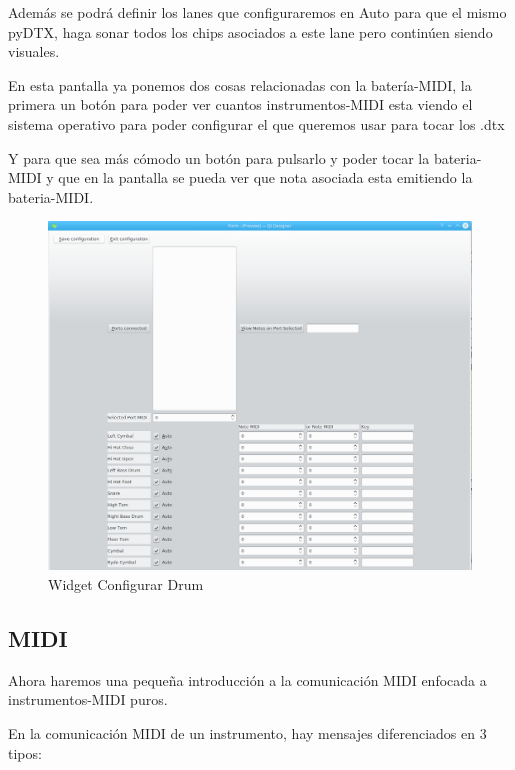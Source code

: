 \documentclass[a4paper,11pt,oneside]{book}
\begin{document}
Además se podrá definir los lanes que configuraremos en Auto para que el mismo pyDTX, haga sonar todos los chips asociados a este lane pero continúen siendo visuales.

En esta pantalla ya ponemos dos cosas relacionadas con la batería-MIDI, la primera un botón para poder ver cuantos instrumentos-MIDI esta viendo el sistema operativo para poder configurar el que queremos usar para tocar los .dtx

Y para que sea más cómodo un botón para pulsarlo y poder tocar la bateria-MIDI y que en la pantalla se pueda ver que nota asociada esta emitiendo la bateria-MIDI.

\begin{figure}[H]
\begin{center}
\includegraphics[scale=0.4]{Imagenes/WidgetConfigurarDrum.png}
\caption{Widget Configurar Drum}
\label{Widget Configurar Drum}
\end{center}
\end{figure}


\subsection{MIDI} 
Ahora haremos una pequeña introducción a la comunicación MIDI enfocada a instrumentos-MIDI puros.

En la comunicación MIDI de un instrumento, hay mensajes diferenciados en 3 tipos:
\end{document}

